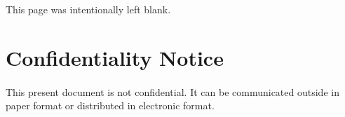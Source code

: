 \documentclass[twoside, 12pt]{article}
\begin{document}
\section*{}
\vfill
\paragraph{}
\begin{center}
    This page was intentionally left blank.
\end{center}
\vfill

\newpage

\section*{Confidentiality Notice}
\vfill
\paragraph{}
This present document is not confidential. It can be communicated outside in paper format
or distributed in electronic format.
\vfill






\newpage
\tableofcontents

\newpage
\listoffigures

\fancyhead[CE]{\leftmark}






\printbibliography
{
\cleardoublepage 
{} 
{}
}


\end{document}

